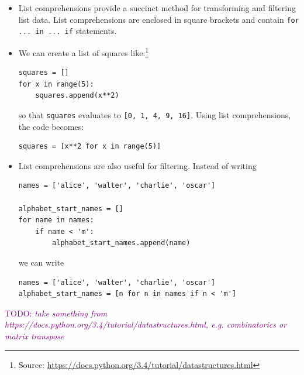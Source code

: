\documentclass[a4paper,twoside,titlepage]{memoir}
\makeatletter
\newcommand{\FrameTitle}[2]{%
  \fboxrule=\FrameRule \fboxsep=\FrameSep
  \fbox{\vbox{\nobreak \vskip -0.7\FrameSep
    \rlap{\centerline{\strut#1}}\nobreak\nointerlineskip%
    \vskip 0.7\FrameSep
    \hbox{#2}}}}
\newenvironment{framewithtitle}[2][\FrameFirst@Lab\ (cont.)]{%
  \def\FrameFirst@Lab{\textbf{#2}}%
  \def\FrameCont@Lab{\textbf{#1}}%
  \def\FrameCommand##1{%
    \FrameTitle{\FrameFirst@Lab}{##1}}%
  \def\FirstFrameCommand##1{%
    \FrameTitle{\FrameFirst@Lab}{##1}}%
  \def\MidFrameCommand##1{%
    \FrameTitle{\FrameCont@Lab}{##1}}%
  \def\LastFrameCommand##1{%
    \FrameTitle{\FrameCont@Lab}{##1}}%
\MakeFramed{\advance\hsize-\width \FrameRestore}}%
{\endMakeFramed}
\newcounter{exercisectr}
\newenvironment{exercise}
{\stepcounter{exercisectr}\begin{framewithtitle}{Practical \arabic{exercisectr}}}
{\end{framewithtitle}}
\newcommand{\shellcmd}{\texttt}
\newcommand{\TODO}[1]{\textcolor{purple}{TODO: \emph{#1}}}
\makeatother
\begin{document}
\begin{itemize}
	\item List comprehensions provide a succinct method for transforming and filtering list data.  List comprehensions are enclosed in square brackets and contain \shellcmd{for ... in ... if} statements.

	\item We can create a list of squares like:\footnote{Source: \url{https://docs.python.org/3.4/tutorial/datastructures.html}}
\begin{verbatim}
squares = []
for x in range(5):
	squares.append(x**2)
\end{verbatim}
so that \shellcmd{squares} evaluates to \shellcmd{[0, 1, 4, 9, 16]}.  Using list comprehensions, the code becomes:
\begin{verbatim}
squares = [x**2 for x in range(5)]
\end{verbatim}

	\item List comprehensions are also useful for filtering.  Instead of writing
\begin{verbatim}
names = ['alice', 'walter', 'charlie', 'oscar']

alphabet_start_names = []
for name in names:
	if name < 'm':
		alphabet_start_names.append(name)
\end{verbatim}
we can write
\begin{verbatim}
names = ['alice', 'walter', 'charlie', 'oscar']
alphabet_start_names = [n for n in names if n < 'm']
\end{verbatim}
\end{itemize}

\begin{exercise}
	\TODO{take something from https://docs.python.org/3.4/tutorial/datastructures.html, e.g. combinatorics or matrix transpose}
\end{exercise}
\end{document}
